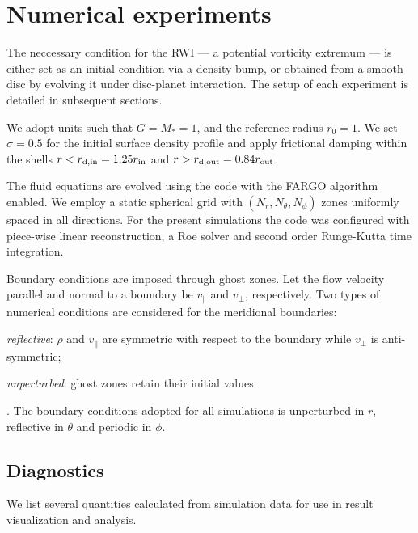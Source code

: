 \section{Numerical experiments}\label{sims}
The neccessary condition for the RWI --- a potential vorticity 
extremum --- is either set as an initial condition via a density bump, 
or obtained from a smooth disc by evolving it under disc-planet
interaction. The setup of each experiment is detailed in subsequent
sections.    

We adopt units such that $G=M_*=1$, and the reference radius $r_0=1$.    
We set $\sigma=0.5$ for the initial surface density profile and apply 
frictional damping within the shells $r<r_\mathrm{d,in} = 1.25r_\mathrm{in}$
and $r>r_\mathrm{d,out}=0.84r_\mathrm{out}$.

The fluid equations are evolved using the \pluto code \citep{mignone07} with 
the FARGO algorithm enabled\citep{mignone12}. We employ a static
spherical grid with $(N_r, N_\theta, N_\phi)$ zones uniformly spaced
in all directions. For the present simulations the code was configured
with piece-wise linear reconstruction, a Roe solver and second order
Runge-Kutta time integration.   

Boundary conditions are imposed through ghost zones.   
Let the flow velocity parallel and normal to a boundary be
$v_\parallel$ and $v_\perp$, respectively. %
Two types of numerical 
conditions are considered for the meridional boundaries:
\begin{inparaenum}[(a)]
\item \emph{reflective}: $\rho$ and $v_\parallel$ are symmetric with
  respect to the boundary while $v_\perp$ is anti-symmetric;  
\item \emph{unperturbed}: ghost zones retain their initial values
\end{inparaenum}.
The boundary conditions adopted for all simulations is unperturbed in
$r$, reflective in $\theta$ and periodic in $\phi$. 


\subsection{Diagnostics}
We list several quantities calculated from simulation data for use in
result visualization and analysis.  

